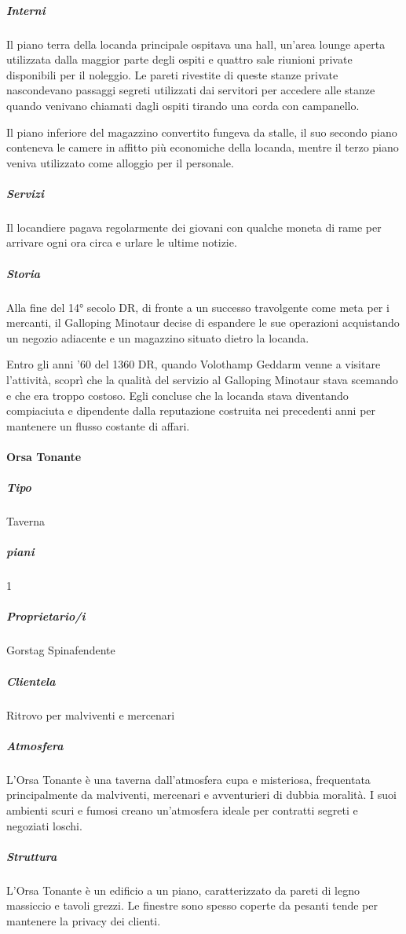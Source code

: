 \documentclass{article}
\begin{document}
\subparagraph{Interni}
Il piano terra della locanda principale ospitava una hall, un'area lounge aperta utilizzata dalla maggior parte degli ospiti e quattro sale riunioni private disponibili per il noleggio. Le pareti rivestite di queste stanze private nascondevano passaggi segreti utilizzati dai servitori per accedere alle stanze quando venivano chiamati dagli ospiti tirando una corda con campanello.

Il piano inferiore del magazzino convertito fungeva da stalle, il suo secondo piano conteneva le camere in affitto più economiche della locanda, mentre il terzo piano veniva utilizzato come alloggio per il personale.

\subparagraph{Servizi}
Il locandiere pagava regolarmente dei giovani con qualche moneta di rame per arrivare ogni ora circa e urlare le ultime notizie.

\subparagraph{Storia}
Alla fine del 14° secolo DR, di fronte a un successo travolgente come meta per i mercanti, il Galloping Minotaur decise di espandere le sue operazioni acquistando un negozio adiacente e un magazzino situato dietro la locanda.

Entro gli anni '60 del 1360 DR, quando Volothamp Geddarm venne a visitare l'attività, scoprì che la qualità del servizio al Galloping Minotaur stava scemando e che era troppo costoso. Egli concluse che la locanda stava diventando compiaciuta e dipendente dalla reputazione costruita nei precedenti anni per mantenere un flusso costante di affari.


\paragraph{Orsa Tonante}

\subparagraph{Tipo}
Taverna

\subparagraph{piani}
1



\subparagraph{Proprietario/i}
Gorstag Spinafendente

\subparagraph{Clientela}
Ritrovo per malviventi e mercenari

\subparagraph{Atmosfera}
L'Orsa Tonante è una taverna dall'atmosfera cupa e misteriosa, frequentata principalmente da malviventi, mercenari e avventurieri di dubbia moralità. I suoi ambienti scuri e fumosi creano un'atmosfera ideale per contratti segreti e negoziati loschi.

\subparagraph{Struttura}
L'Orsa Tonante è un edificio a un piano, caratterizzato da pareti di legno massiccio e tavoli grezzi. Le finestre sono spesso coperte da pesanti tende per mantenere la privacy dei clienti.
\end{document}
